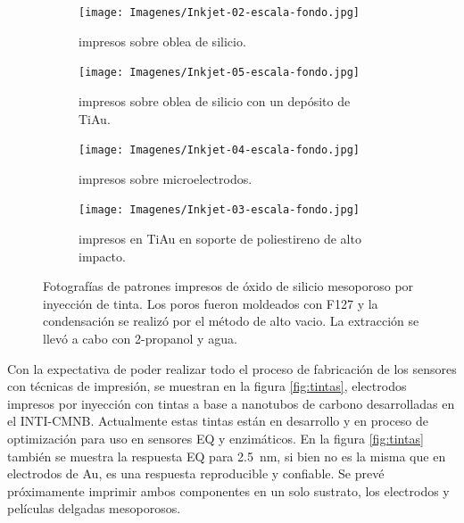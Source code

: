  	  		\begin{figure}[th]
			 	   	    \centering
			 	   	    \begin{subfigure}[t]{0.495\textwidth}
			        	\texttt{[image: Imagenes/Inkjet-02-escala-fondo.jpg]}
			        	\caption{\pdmF\space impresos sobre oblea de silicio.}
			       		\end{subfigure}
			     		\centering
			     		\begin{subfigure}[t]{0.495\textwidth}
			     		\texttt{[image: Imagenes/Inkjet-05-escala-fondo.jpg]}
			    		\caption{\pdmF\space impresos sobre oblea de silicio con un depósito de Ti\textbar Au.}
			    		\end{subfigure}
			    		\centering
			    		\begin{subfigure}[t]{0.495\textwidth}
			         	\texttt{[image: Imagenes/Inkjet-04-escala-fondo.jpg]}
			        	\caption{\pdmF\space impresos sobre microelectrodos.}
			        	\end{subfigure}
			        	\centering
			        	\begin{subfigure}[t]{0.495\textwidth}
			     		\texttt{[image: Imagenes/Inkjet-03-escala-fondo.jpg]}
 			        	\caption{\pdmF\space impresos en Ti\textbar	Au en soporte de poliestireno de alto impacto.}
			        	\end{subfigure}
			     		\caption[Electrodos impresos]{Fotografías de patrones impresos de óxido de silicio mesoporoso por inyección de tinta. Los poros fueron moldeados con F127 y la condensación se realizó por el método de alto vacio. La extracción se llevó a cabo con 2-propanol y agua.}
			     		\label{fig:flexibles}
			     	   	\end{figure}
			     	  
 	  Con la expectativa de poder realizar todo el proceso de fabricación de los sensores con técnicas de impresión, se muestran en la figura \ref{fig:tintas}, electrodos impresos por inyección con tintas a base a nanotubos de carbono desarrolladas en el INTI-CMNB. Actualmente estas tintas están en desarrollo y en proceso de optimización para uso en sensores EQ y enzimáticos\cite{Longinotti2010,Mass2016}. En la figura \ref{fig:tintas} también se muestra la respuesta EQ para \fe\space \SI{2.5}{\nm}, si bien no es la misma que en electrodos de Au, es una respuesta reproducible y confiable. Se prevé próximamente imprimir ambos componentes en un solo sustrato, los electrodos y películas delgadas mesoporosos.

